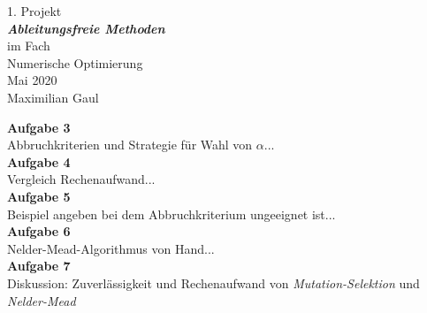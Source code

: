\documentclass[a4paper, 12pt]{report}
\begin{document}
\begin{center}
    \vspace*{2em}
    \normalsize 1. Projekt\\
    \vspace*{1em}
    \normalsize \textbf{\textit{Ableitungsfreie Methoden}}\\
    \vspace*{4em}
    \normalsize im Fach\\
    \vspace*{1em}
    \large Numerische Optimierung\\
    \vspace*{30em}
    \normalsize Mai 2020\\
    \vspace*{1em}
    \normalsize Maximilian Gaul
\end{center}

\thispagestyle{empty}

\newpage

\textbf{Aufgabe 3}\\
Abbruchkriterien und Strategie für Wahl von $\alpha$...
\\

\textbf{Aufgabe 4}\\
Vergleich Rechenaufwand...
\\

\textbf{Aufgabe 5}\\
Beispiel angeben bei dem Abbruchkriterium ungeeignet ist...
\\

\textbf{Aufgabe 6}\\
Nelder-Mead-Algorithmus von Hand...
\\

\textbf{Aufgabe 7}\\
Diskussion: Zuverlässigkeit und Rechenaufwand von \textit{Mutation-Selektion} und \textit{Nelder-Mead}
\end{document}
